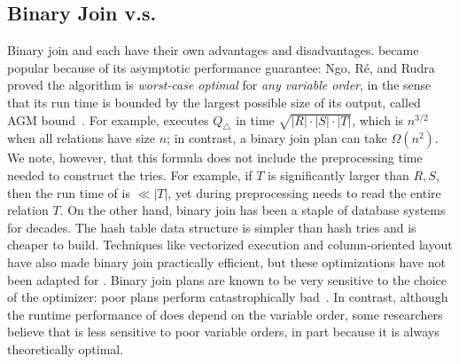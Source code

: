 
\subsection{Binary Join v.s. \GJ}
Binary join and \GJ each have their own advantages and disadvantages.
\GJ became popular because of its asymptotic performance guarantee:
Ngo, R{\'{e}}, and Rudra~\cite{DBLP:journals/sigmod/NgoRR13} proved the algorithm is
\emph{worst-case optimal} for \emph{any variable order}, in the sense
that its run time is bounded by the largest possible size of its
output, called AGM bound~\cite{DBLP:journals/siamcomp/AtseriasGM13}.
For example, \GJ executes $Q_\triangle$ in time
$\sqrt{|R|\cdot |S| \cdot |T|}$, which is $n^{3/2}$ when all relations
have size $n$; in contrast, a binary join plan can take $\Omega(n^2)$.
We note, however, that this formula does not include the preprocessing
time needed to construct the tries.  For example, if $T$ is
significantly larger than $R, S$, then the run time of \GJ is
$\ll |T|$, yet during preprocessing \GJ needs to read the entire
relation $T$.  On the other hand, binary join has been a staple of
database systems for decades.  The hash table data structure is
simpler than hash tries and is cheaper to build.  Techniques like
vectorized execution and column-oriented layout have also made binary
join practically efficient, but these optimizations have not been
adapted for \GJ.  Binary join plans are known to be very sensitive to
the choice of the optimizer: poor plans perform catastrophically
bad~\cite{DBLP:journals/pvldb/LeisGMBK015}.  In contrast, although the
runtime performance of \GJ does depend on the variable order, some
researchers believe that \GJ is less sensitive to poor variable
orders, in part because it is always theoretically optimal.


